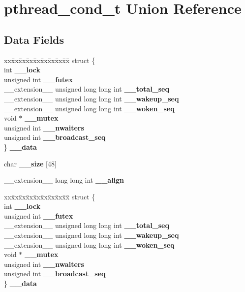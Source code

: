 \section{pthread\_\-cond\_\-t Union Reference}
\label{unionpthread__cond__t}
\subsection*{Data Fields}
\begin{DoxyCompactItemize}
\item 
\begin{tabbing}
xx\=xx\=xx\=xx\=xx\=xx\=xx\=xx\=xx\=\kill
struct \{\\
\>int {\bf \_\_lock}\\
\>unsigned int {\bf \_\_futex}\\
\>\_\_extension\_\_ unsigned long long int {\bf \_\_total\_seq}\\
\>\_\_extension\_\_ unsigned long long int {\bf \_\_wakeup\_seq}\\
\>\_\_extension\_\_ unsigned long long int {\bf \_\_woken\_seq}\\
\>void $\ast$ {\bf \_\_mutex}\\
\>unsigned int {\bf \_\_nwaiters}\\
\>unsigned int {\bf \_\_broadcast\_seq}\\
\} {\bf \_\_data}\\

\end{tabbing}\item 
char {\bf \_\-\_\-size} [48]
\item 
\_\-\_\-extension\_\-\_\- long long int {\bf \_\-\_\-align}
\item 
\begin{tabbing}
xx\=xx\=xx\=xx\=xx\=xx\=xx\=xx\=xx\=\kill
struct \{\\
\>int {\bf \_\_lock}\\
\>unsigned int {\bf \_\_futex}\\
\>\_\_extension\_\_ unsigned long long int {\bf \_\_total\_seq}\\
\>\_\_extension\_\_ unsigned long long int {\bf \_\_wakeup\_seq}\\
\>\_\_extension\_\_ unsigned long long int {\bf \_\_woken\_seq}\\
\>void $\ast$ {\bf \_\_mutex}\\
\>unsigned int {\bf \_\_nwaiters}\\
\>unsigned int {\bf \_\_broadcast\_seq}\\
\} {\bf \_\_data}\\

\end{tabbing}\end{DoxyCompactItemize}


